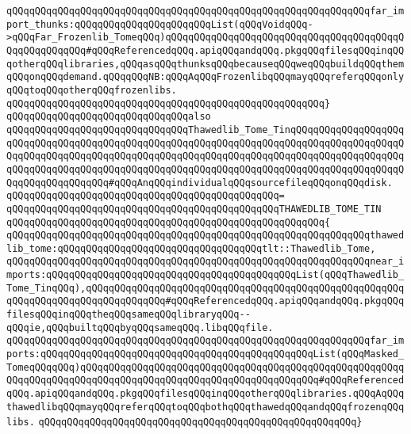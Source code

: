 \verb|qQQqqQQqqQQqqQQqqQQqqQQqqQQqqQQqqQQqqQQqqQQqqQQqqQQqqQQqqQQqqQQqfar_import_thunks:qQQqqQQqqQQqqQQqqQQqqQQqList(qQQqVoidqQQq->qQQqFar_Frozenlib_TomeqQQq)qQQqqQQqqQQqqQQqqQQqqQQqqQQqqQQqqQQqqQQqqQQqqQQqqQQqqQQq#qQQqReferencedqQQq.apiqQQqandqQQq.pkgqQQqfilesqQQqinqQQqotherqQQqlibraries,qQQqasqQQqthunksqQQqbecauseqQQqweqQQqbuildqQQqthemqQQqonqQQqdemand.qQQqqQQqNB:qQQqAqQQqFrozenlibqQQqmayqQQqreferqQQqonlyqQQqtoqQQqotherqQQqfrozenlibs.|\newline
\verb|qQQqqQQqqQQqqQQqqQQqqQQqqQQqqQQqqQQqqQQqqQQqqQQqqQQqqQQq}|\newline
\newline
\verb|qQQqqQQqqQQqqQQqqQQqqQQqqQQqqQQqalso|\newline
\verb|qQQqqQQqqQQqqQQqqQQqqQQqqQQqqQQqThawedlib_Tome_TinqQQqqQQqqQQqqQQqqQQqqQQqqQQqqQQqqQQqqQQqqQQqqQQqqQQqqQQqqQQqqQQqqQQqqQQqqQQqqQQqqQQqqQQqqQQqqQQqqQQqqQQqqQQqqQQqqQQqqQQqqQQqqQQqqQQqqQQqqQQqqQQqqQQqqQQqqQQqqQQqqQQqqQQqqQQqqQQqqQQqqQQqqQQqqQQqqQQqqQQqqQQqqQQqqQQqqQQqqQQqqQQqqQQqqQQqqQQqqQQqqQQqqQQq#qQQqAnqQQqindividualqQQqsourcefileqQQqonqQQqdisk.|\newline
\verb|qQQqqQQqqQQqqQQqqQQqqQQqqQQqqQQqqQQqqQQqqQQqqQQq=|\newline
\verb|qQQqqQQqqQQqqQQqqQQqqQQqqQQqqQQqqQQqqQQqqQQqqQQqTHAWEDLIB_TOME_TIN|\newline
\verb|qQQqqQQqqQQqqQQqqQQqqQQqqQQqqQQqqQQqqQQqqQQqqQQqqQQqqQQq{|\newline
\verb|qQQqqQQqqQQqqQQqqQQqqQQqqQQqqQQqqQQqqQQqqQQqqQQqqQQqqQQqqQQqqQQqthawedlib_tome:qQQqqQQqqQQqqQQqqQQqqQQqqQQqqQQqqQQqtlt::Thawedlib_Tome,|\newline
\verb|qQQqqQQqqQQqqQQqqQQqqQQqqQQqqQQqqQQqqQQqqQQqqQQqqQQqqQQqqQQqqQQqnear_imports:qQQqqQQqqQQqqQQqqQQqqQQqqQQqqQQqqQQqqQQqqQQqList(qQQqThawedlib_Tome_TinqQQq),qQQqqQQqqQQqqQQqqQQqqQQqqQQqqQQqqQQqqQQqqQQqqQQqqQQqqQQqqQQqqQQqqQQqqQQqqQQqqQQqqQQq#qQQqReferencedqQQq.apiqQQqandqQQq.pkgqQQqfilesqQQqinqQQqtheqQQqsameqQQqlibraryqQQq--qQQqie,qQQqbuiltqQQqbyqQQqsameqQQq.libqQQqfile.|\newline
\verb|qQQqqQQqqQQqqQQqqQQqqQQqqQQqqQQqqQQqqQQqqQQqqQQqqQQqqQQqqQQqqQQqfar_imports:qQQqqQQqqQQqqQQqqQQqqQQqqQQqqQQqqQQqqQQqqQQqqQQqList(qQQqMasked_TomeqQQqqQQq)qQQqqQQqqQQqqQQqqQQqqQQqqQQqqQQqqQQqqQQqqQQqqQQqqQQqqQQqqQQqqQQqqQQqqQQqqQQqqQQqqQQqqQQqqQQqqQQqqQQqqQQqqQQqqQQq#qQQqReferencedqQQq.apiqQQqandqQQq.pkgqQQqfilesqQQqinqQQqotherqQQqlibraries.qQQqAqQQqthawedlibqQQqmayqQQqreferqQQqtoqQQqbothqQQqthawedqQQqandqQQqfrozenqQQqlibs.|\newline
\verb|qQQqqQQqqQQqqQQqqQQqqQQqqQQqqQQqqQQqqQQqqQQqqQQqqQQqqQQq}|\newline
